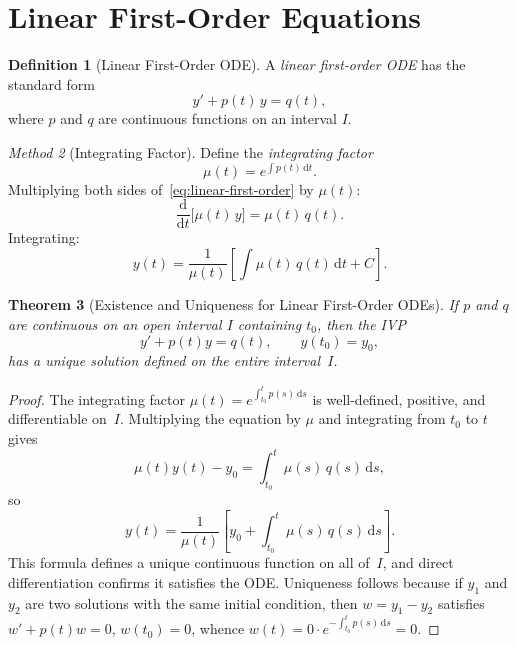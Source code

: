\documentclass[12pt,a4paper,openany]{book}
\theoremstyle{definition}
\newtheorem{definition}{Definition}[chapter]
\theoremstyle{plain}
\newtheorem{theorem}[definition]{Theorem}
\theoremstyle{remark}
\newtheorem{method}[definition]{Method}
\newcommand{\dd}{\mathrm{d}}
\begin{document}
\section{Linear First-Order Equations}
\label{sec:linear-first-order}

\begin{definition}[Linear First-Order ODE]
\label{def:linear-first-order}
A \emph{linear first-order ODE} has the standard form
\begin{equation}\label{eq:linear-first-order}
  y' + p(t)\,y = q(t),
\end{equation}
where $p$ and $q$ are continuous functions on an interval $I$.
\end{definition}

\begin{method}[Integrating Factor]
\label{meth:integrating-factor}
Define the \emph{integrating factor}
\begin{equation}\label{eq:integrating-factor}
  \mu(t) = e^{\int p(t)\,\dd t}.
\end{equation}
Multiplying both sides of~\eqref{eq:linear-first-order} by $\mu(t)$:
\[
  \frac{\dd}{\dd t}\!\bigl[\mu(t)\,y\bigr] = \mu(t)\,q(t).
\]
Integrating:
\begin{equation}\label{eq:linear-solution}
  y(t) = \frac{1}{\mu(t)}\left[\int \mu(t)\,q(t)\,\dd t + C\right].
\end{equation}
\end{method}

\begin{theorem}[Existence and Uniqueness for Linear First-Order ODEs]
\label{thm:linear-existence}
If $p$ and $q$ are continuous on an open interval $I$ containing $t_0$, then the IVP
\[
  y' + p(t)y = q(t), \qquad y(t_0) = y_0,
\]
has a unique solution defined on the entire interval~$I$.
\end{theorem}

\begin{proof}
The integrating factor $\mu(t) = e^{\int_{t_0}^{t} p(s)\,\dd s}$ is well-defined, positive, and differentiable on~$I$. Multiplying the equation by $\mu$ and integrating from $t_0$ to $t$ gives
\[
  \mu(t)y(t) - y_0 = \int_{t_0}^{t}\mu(s)\,q(s)\,\dd s,
\]
so
\[
  y(t) = \frac{1}{\mu(t)}\left[y_0 + \int_{t_0}^{t}\mu(s)\,q(s)\,\dd s\right].
\]
This formula defines a unique continuous function on all of~$I$, and direct differentiation confirms it satisfies the ODE. Uniqueness follows because if $y_1$ and $y_2$ are two solutions with the same initial condition, then $w = y_1 - y_2$ satisfies $w' + p(t)w = 0$, $w(t_0) = 0$, whence $w(t) = 0\cdot e^{-\int_{t_0}^t p(s)\,\dd s} = 0$.
\end{proof}
\end{document}
